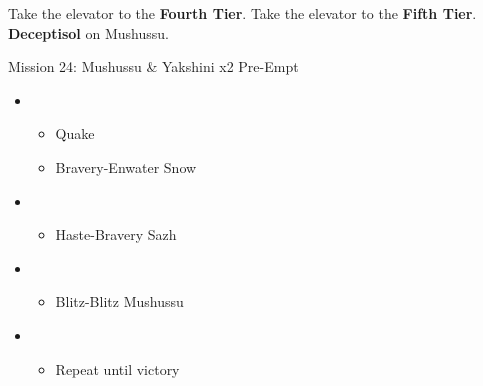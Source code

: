 \begin{multicols}{2}
	Take the elevator to the \textbf{Fourth Tier}.
	Take the elevator to the \textbf{Fifth Tier}.
	\textbf{Deceptisol} on Mushussu.

	\begin{battle}[0:28]{Mission 24: Mushussu \& Yakshini x2 Pre-Empt}
		\begin{itemize}
			\item \first
			      \begin{itemize}
				      \item Quake
				      \item Bravery-Enwater Snow
			      \end{itemize}
			\item \fifth
			      \begin{itemize}
				      \item Haste-Bravery Sazh
			      \end{itemize}
			\item \fourth
			      \begin{itemize}
				      \item Blitz-Blitz Mushussu
			      \end{itemize}
			\item \sixth
			      \begin{itemize}
				      \item Repeat until victory
			      \end{itemize}
		\end{itemize}
	\end{battle}


\end{multicols}

